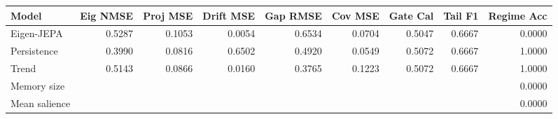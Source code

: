 \begin{tabular}{lrrrrrrrr}
\toprule
Model & Eig NMSE & Proj MSE & Drift MSE & Gap RMSE & Cov MSE & Gate Cal & Tail F1 & Regime Acc \\
\midrule
Eigen-JEPA & 0.5287 & 0.1053 & 0.0054 & 0.6534 & 0.0704 & 0.5047 & 0.6667 & 0.0000 \\
Persistence & 0.3990 & 0.0816 & 0.6502 & 0.4920 & 0.0549 & 0.5072 & 0.6667 & 1.0000 \\
Trend & 0.5143 & 0.0866 & 0.0160 & 0.3765 & 0.1223 & 0.5072 & 0.6667 & 1.0000 \\
\midrule
Memory size & \multicolumn{8}{r}{0.0000} \\
Mean salience & \multicolumn{8}{r}{0.0000} \\
\bottomrule
\end{tabular}